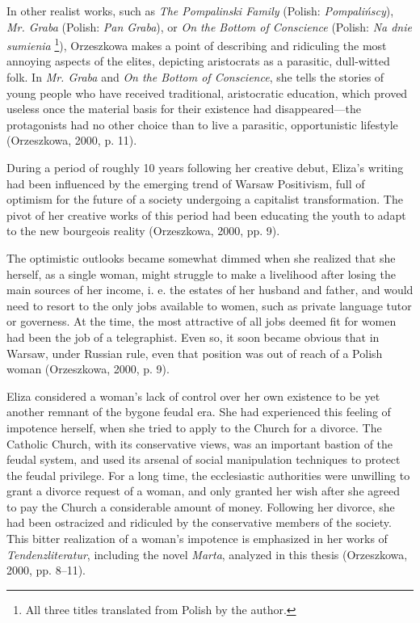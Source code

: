 In other realist works, such as \textit{The Pompalinski Family} (Polish: \textit{Pompali\'nscy}), \textit{Mr. Graba} (Polish: \textit{Pan Graba}), or \textit{On the Bottom of Conscience} (Polish: \textit{Na dnie sumienia}%
\footnote{All three titles translated from Polish by the author.}), Orzeszkowa makes a point of describing and ridiculing the most annoying aspects of the elites, depicting aristocrats as a parasitic, dull-witted folk.
In \textit{Mr. Graba} and \textit{On the Bottom of Conscience}, she tells the stories of young people who have received traditional, aristocratic education, which proved useless once the material basis for their existence had disappeared---the protagonists had no other choice than to live a parasitic, opportunistic lifestyle
(Orzeszkowa, 2000, p. 11).

During a period of roughly 10 years following her creative debut, Eliza's writing had been influenced by the emerging trend of Warsaw Positivism, full of optimism for the future of a society undergoing a capitalist transformation.
The pivot of her creative works of this period had been educating the youth to adapt to the new bourgeois reality 
(Orzeszkowa, 2000, pp. 9).

The optimistic outlooks became somewhat dimmed when she realized that she herself, as a single woman, might struggle to make a livelihood after losing the main sources of her income, i. e. the estates of her husband and father, and would need to resort to the only jobs available to women, such as private language tutor or governess.
At the time, the most attractive of all jobs deemed fit for women had been the job of a telegraphist.
Even so, it soon became obvious that in Warsaw, under Russian rule, even that position was out of reach of a Polish woman
(Orzeszkowa, 2000, p. 9).

Eliza considered a woman's lack of control over her own existence to be yet another remnant of the bygone feudal era.
She had experienced this feeling of impotence herself, when she tried to apply to the Church for a divorce.
The Catholic Church, with its conservative views, was an important bastion of the feudal system, and used its arsenal of social manipulation techniques to protect the feudal privilege.
For a long time, the ecclesiastic authorities were unwilling to grant a divorce request of a woman, and only granted her wish after she agreed to pay the Church a considerable amount of money.
Following her divorce, she had been ostracized and ridiculed by the conservative members of the society.
This bitter realization of a woman's impotence is emphasized in her works of \textit{Tendenzliteratur}, including the novel \textit{Marta}, analyzed in this thesis
(Orzeszkowa, 2000, pp. 8--11).

